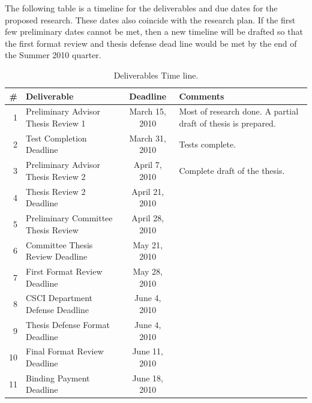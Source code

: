 \documentclass{sbthesis}
\begin{document}

The following table is a timeline for the deliverables and due dates for the proposed research.  These dates also coincide with the research plan.  If the first few preliminary dates cannot be met, then a new timeline will be drafted so that the first format review and thesis defense dead line would be met by the end of the Summer 2010 quarter.

\begin{table}
\caption{Deliverables Time line.}\label{t-timeline}
\begin{center}
\begin{tabular}{|r|l|c|p{1.5in}|}\hline
\# & Deliverable                        & Deadline        & Comments \\\hline\hline
1 & Preliminary Advisor Thesis Review 1 & March 15, 2010  & Most of research done.  A partial draft of thesis is prepared.\\\hline
2 & Test Completion Deadline            & March 31, 2010  & Tests complete.\\\hline
3 & Preliminary Advisor Thesis Review 2 & April 7,  2010  & Complete draft of the thesis.\\\hline
4 & Thesis Review 2 Deadline            & April 21, 2010  &\\\hline
5 & Preliminary Committee Thesis Review & April 28, 2010  &\\\hline
6 & Committee Thesis Review Deadline    & May   21, 2010  &\\\hline
7 & First Format Review Deadline        & May   28, 2010  &\\\hline
8 & CSCI Department Defense Deadline    & June  4,  2010  &\\\hline
9 & Thesis Defense Format Deadline      & June  4,  2010  &\\\hline
10 & Final Format Review Deadline        & June  11, 2010  &\\\hline
11 & Binding Payment Deadline            & June  18, 2010  &\\\hline


\end{tabular}
\end{center}
\end{table}
\end{document}
